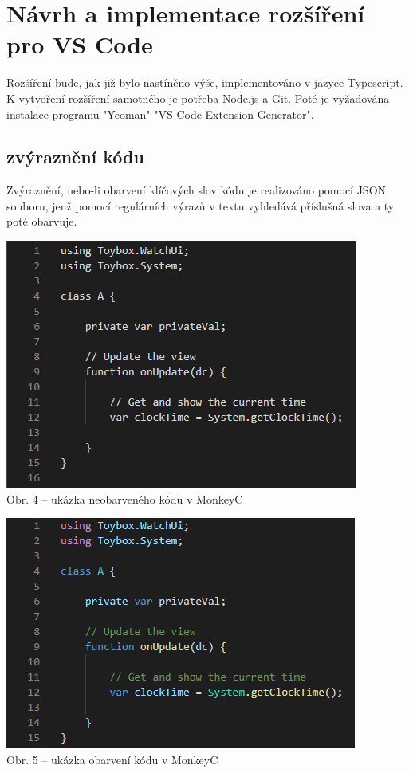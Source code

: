 \documentclass[czech,master,dept460,male,cpp,cpdeclaration]{diploma}
\begin{document}
\section{Návrh a implementace rozšíření pro VS Code}
Rozšíření bude, jak již bylo nastíněno výše, implementováno v jazyce Typescript. 
K vytvoření rozšíření samotného je potřeba Node.js a Git. Poté je vyžadována instalace programu "Yeoman" "VS Code Extension Generator".

\subsection{zvýraznění kódu}

Zvýraznění, nebo-li obarvení klíčových slov kódu je realizováno pomocí JSON souboru, jenž pomocí regulárních výrazů v textu vyhledává příslušná slova a ty poté obarvuje.
\\
\begin{center}
	\includegraphics[]{uncolored_code}
	\\
	Obr. 4 – ukázka neobarveného kódu v MonkeyC
\end{center}

\begin{center}

	\includegraphics[]{colored_code}
	\\
	Obr. 5 – ukázka obarvení kódu v MonkeyC
\end{center}
	
\end{document}
